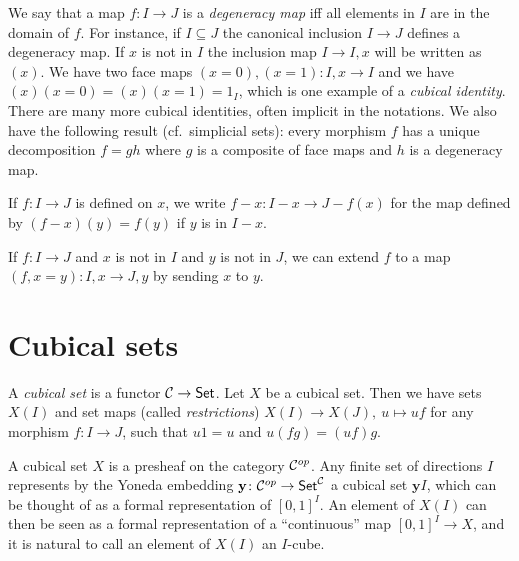 \documentclass[10pt,a4paper]{article}
\newcommand{\CC}{{\mathcal C}}
\newcommand{\yoneda}{\mathbf{y}}
\begin{document}
 We say that a map $f:I\to J$ is a {\em degeneracy map} if{f} all elements in $I$ are in
the domain of $f$. For instance, if $I\subseteq J$ the canonical inclusion $I \to J$ defines
a degeneracy map. If $x$ is not in $I$ the inclusion map $I \to I,x$ will be written as $(x)$.
We have two face maps $(x=0), (x=1):I,x\to I$ and we
have $(x)(x=0) = (x)(x=1) = 1_I$, which is one example of a \emph{cubical identity}.
There are many more cubical identities, often implicit in the notations. We also have
the following result (cf.\ simplicial sets): every morphism $f$ has a unique decomposition
$f=gh$ where $g$ is a composite of face maps and $h$ is a degeneracy map.

 If $f:I\to J$ is defined on $x$, we write $f-x:I-x \to J-{f(x)}$ for the map defined by
$(f-x)(y) = f(y)$ if $y$ is in $I-x.$

If $f:I\to J$ and $x$ is not in $I$ and $y$ is not in $J$, we can
extend $f$ to a map $(f,x=y):I,x\to J,y$ by sending $x$ to $y$.

\section{Cubical sets}

A \emph{cubical set} is a functor $\CC\to{\sf Set}$.  Let $X$ be a
cubical set. Then we have sets $X(I)$ and set maps (called
\emph{restrictions}) $X(I)\to X(J),~u\longmapsto uf$ for any morphism
$f:I\to J$, such that $u1 = u$ and $u(fg) = (uf)g$.

\medskip

A cubical set $X$ is a presheaf on the category ${\cal C}^{op}$. Any
finite set of directions $I$ represents by the Yoneda embedding
$\yoneda \colon {\cal C}^{op} \to {\sf Set}^{\cal C}$ a cubical set
$\yoneda I$, which can be thought of as a formal representation of
$[0,1]^I$.  An element of $X(I)$ can then be seen as a formal
representation of a ``continuous'' map $[0,1]^I\to X$, and it is
natural to call an element of $X(I)$ an $I$-cube.
\end{document}
